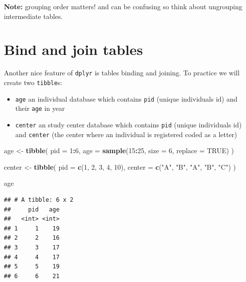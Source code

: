 \documentclass[
]{book}
\newenvironment{Shaded}{\begin{snugshade}}{\end{snugshade}}
\newcommand{\AttributeTok}[1]{\textcolor[rgb]{0.13,0.29,0.53}{#1}}
\newcommand{\ConstantTok}[1]{\textcolor[rgb]{0.56,0.35,0.01}{#1}}
\newcommand{\DecValTok}[1]{\textcolor[rgb]{0.00,0.00,0.81}{#1}}
\newcommand{\FunctionTok}[1]{\textcolor[rgb]{0.13,0.29,0.53}{\textbf{#1}}}
\newcommand{\NormalTok}[1]{#1}
\newcommand{\OtherTok}[1]{\textcolor[rgb]{0.56,0.35,0.01}{#1}}
\newcommand{\SpecialCharTok}[1]{\textcolor[rgb]{0.81,0.36,0.00}{\textbf{#1}}}
\newcommand{\StringTok}[1]{\textcolor[rgb]{0.31,0.60,0.02}{#1}}
\providecommand{\tightlist}{%
  \setlength{\itemsep}{0pt}\setlength{\parskip}{0pt}}
\begin{document}
\textbf{Note:} grouping order matters! and can be confusing so think about ungrouping intermediate tables.

\section{Bind and join tables}\label{bind-and-join-tables}

Another nice feature of \texttt{dplyr} is tables binding and joining. To practice we will create two \texttt{tibble}s:

\begin{itemize}
\tightlist
\item
  \texttt{age} an individual database which contains \texttt{pid} (unique individuals id)
  and their \texttt{age} in year
\item
  \texttt{center} an study center database which contains \texttt{pid} (unique individuals id)
  and \texttt{center} (the center where an individual is registered coded as a letter)
\end{itemize}

\begin{Shaded}
\begin{Highlighting}[]
\NormalTok{age }\OtherTok{\textless{}{-}}
  \FunctionTok{tibble}\NormalTok{(}
    \AttributeTok{pid =} \DecValTok{1}\SpecialCharTok{:}\DecValTok{6}\NormalTok{,}
    \AttributeTok{age =} \FunctionTok{sample}\NormalTok{(}\DecValTok{15}\SpecialCharTok{:}\DecValTok{25}\NormalTok{, }\AttributeTok{size =} \DecValTok{6}\NormalTok{, }\AttributeTok{replace =} \ConstantTok{TRUE}\NormalTok{)}
\NormalTok{  )}

\NormalTok{center }\OtherTok{\textless{}{-}}
  \FunctionTok{tibble}\NormalTok{(}
    \AttributeTok{pid =} \FunctionTok{c}\NormalTok{(}\DecValTok{1}\NormalTok{, }\DecValTok{2}\NormalTok{, }\DecValTok{3}\NormalTok{, }\DecValTok{4}\NormalTok{, }\DecValTok{10}\NormalTok{),}
    \AttributeTok{center =} \FunctionTok{c}\NormalTok{(}\StringTok{"A"}\NormalTok{, }\StringTok{"B"}\NormalTok{, }\StringTok{"A"}\NormalTok{, }\StringTok{"B"}\NormalTok{, }\StringTok{"C"}\NormalTok{)}
\NormalTok{  )}

\NormalTok{age}
\end{Highlighting}
\end{Shaded}

\begin{verbatim}
## # A tibble: 6 x 2
##     pid   age
##   <int> <int>
## 1     1    19
## 2     2    16
## 3     3    17
## 4     4    17
## 5     5    19
## 6     6    21
\end{verbatim}
\end{document}

